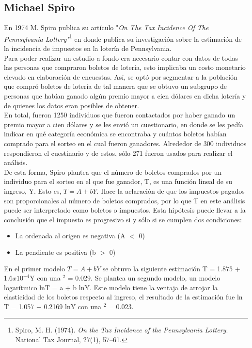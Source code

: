 \newpage

\subsection{Michael Spiro}

En 1974 M. Spiro publica su artículo "\textit{On The Tax Incidence Of The Pennsylvania Lottery"}\footnote{Spiro, M. H. (1974). \textit{On the Tax Incidence of the Pennsylvania Lottery}. National Tax Journal, 27(1), 57–61.} en donde publica su investigación sobre la estimación de la incidencia de impuestos en la lotería de Pennsylvania. \\

Para poder realizar un estudio a fondo era necesario contar con datos de todas las personas que compraron boletos de lotería, esto implicaba un costo monetario elevado en elaboración de encuestas. Así, se optó por segmentar a la población que compró boletos de lotería de tal manera que se obtuvo un subgrupo de personas que habían ganado algún premio mayor a cien dólares en dicha lotería y de quienes los datos eran posibles de obtener. \\

En total, fueron 1250 individuos que fueron contactados por haber ganado un premio mayor a cien dólares y se les envió un cuestionario, en donde se les pedía indicar en qué categoría económica se encontraba y cuántos boletos habían comprado para el sorteo en el cual fueron ganadores. Alrededor de 300 individuos respondieron el cuestinario y de estos, sólo 271 fueron usados para realizar el análisis. \\

De esta forma, Spiro plantea que el número de boletos comprados por un individuo para el sorteo en el que fue ganador, T, es una función lineal de su ingreso, Y. Esto es, $T = A + bY$. Hace la aclaración de que los impuestos pagados son proporcionales al número de boletos comprados, por lo que T en este análisis puede ser interpretado como boletos o impuestos. Esta hipótesis puede llevar a la conclusión que el impuesto es progresivo si y sólo si se cumplen dos condiciones:

\begin{itemize}
    \item La ordenada al origen es negativa (A $<$ 0)
    \item La pendiente es positiva (b $>$ 0)
\end{itemize}

En el primer modelo $T = A + bY$ se obtuvo la siguiente estimación T = 1.875 + 1.6$x10^{-4}$Y con una $^2$ = 0.029. Se plantea un segundo modelo, un modelo logarítmico lnT = a + b lnY. Este modelo tiene la ventaja de arrojar la elasticidad de los boletos respecto al ingreso, el resultado de la estimación fue ln T = 1.057 + 0.2169 lnY con una $^2$ = 0.023. \\

